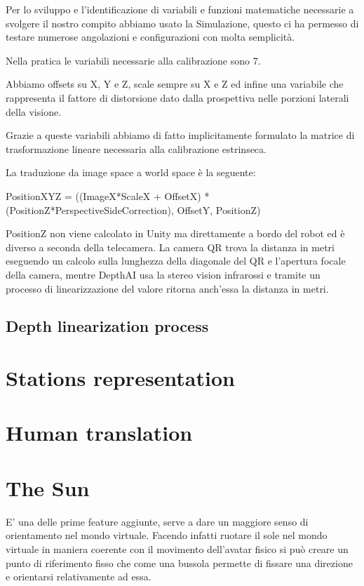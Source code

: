 \documentclass{Configuration_Files/PoliMi3i_thesis}
\begin{document}
Per lo sviluppo e l’identificazione di variabili e funzioni matematiche necessarie a svolgere il nostro compito abbiamo usato la Simulazione, questo ci ha permesso di testare numerose angolazioni e configurazioni con molta semplicità.

Nella pratica le variabili necessarie alla calibrazione sono 7.

Abbiamo offsets su X, Y e Z, scale sempre su X e Z ed infine una variabile che rappresenta il fattore di distorsione dato dalla prospettiva nelle porzioni laterali della visione.

Grazie a queste variabili abbiamo di fatto implicitamente formulato la matrice di trasformazione lineare necessaria alla calibrazione estrinseca.

La traduzione da image space a world space è la seguente:

PositionXYZ = ((ImageX*ScaleX + OffsetX) * (PositionZ*PerspectiveSideCorrection), OffsetY, PositionZ)

PositionZ non viene calcolato in Unity ma direttamente a bordo del robot ed è diverso a seconda della telecamera. La camera QR trova la distanza in metri eseguendo un calcolo sulla lunghezza della diagonale del QR e l’apertura focale della camera, mentre DepthAI usa la stereo vision infrarossi e tramite un processo di linearizzazione del valore ritorna anch’essa la distanza in metri.

\subsection{Depth linearization process}

\section{Stations representation}

\section{Human translation}

\section{The Sun}

E’ una delle prime feature aggiunte, serve a dare un maggiore senso di orientamento nel mondo virtuale. Facendo infatti ruotare il sole nel mondo virtuale in maniera coerente con il movimento dell’avatar fisico si può creare un punto di riferimento fisso che come una bussola permette di fissare una direzione e orientarsi relativamente ad essa.
\end{document}

